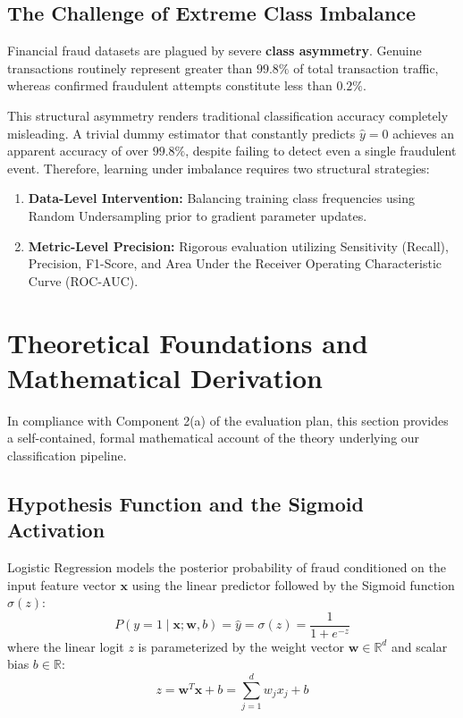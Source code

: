 \documentclass[11pt,a4paper]{article}
\begin{document}
\subsection{The Challenge of Extreme Class Imbalance}
Financial fraud datasets are plagued by severe \textbf{class asymmetry}. Genuine transactions routinely represent greater than $99.8\%$ of total transaction traffic, whereas confirmed fraudulent attempts constitute less than $0.2\%$. 

This structural asymmetry renders traditional classification accuracy completely misleading. A trivial dummy estimator that constantly predicts $\hat{y} = 0$ achieves an apparent accuracy of over $99.8\%$, despite failing to detect even a single fraudulent event. Therefore, learning under imbalance requires two structural strategies:
\begin{enumerate}
    \item \textbf{Data-Level Intervention:} Balancing training class frequencies using Random Undersampling prior to gradient parameter updates.
    \item \textbf{Metric-Level Precision:} Rigorous evaluation utilizing Sensitivity (Recall), Precision, F1-Score, and Area Under the Receiver Operating Characteristic Curve (ROC-AUC).
\end{enumerate}

\section{Theoretical Foundations and Mathematical Derivation}
\label{sec:theory}

In compliance with Component 2(a) of the evaluation plan, this section provides a self-contained, formal mathematical account of the theory underlying our classification pipeline.

\subsection{Hypothesis Function and the Sigmoid Activation}
Logistic Regression models the posterior probability of fraud conditioned on the input feature vector $\mathbf{x}$ using the linear predictor followed by the Sigmoid function $\sigma(z)$:
\begin{equation}
    P(y = 1 \mid \mathbf{x}; \mathbf{w}, b) = \hat{y} = \sigma(z) = \frac{1}{1 + e^{-z}}
\end{equation}
where the linear logit $z$ is parameterized by the weight vector $\mathbf{w} \in \mathbb{R}^d$ and scalar bias $b \in \mathbb{R}$:
\begin{equation}
    z = \mathbf{w}^T \mathbf{x} + b = \sum_{j=1}^d w_j x_j + b
\end{equation}
\end{document}
